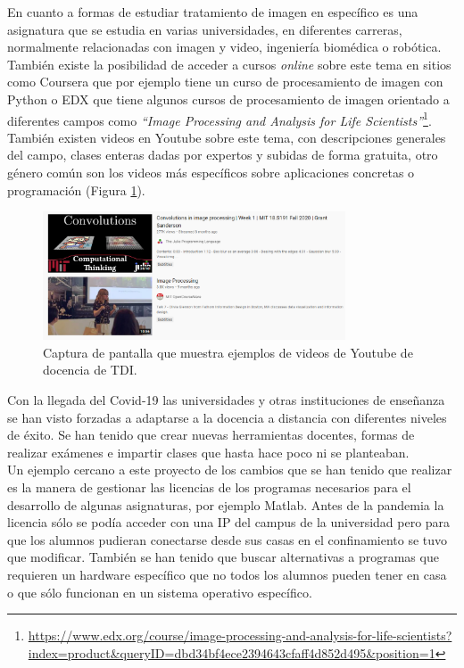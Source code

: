 En cuanto a formas de estudiar tratamiento de imagen en específico es una asignatura que se estudia en varias universidades, en diferentes carreras, normalmente relacionadas con imagen y video, ingeniería biomédica o robótica. También existe la posibilidad de acceder a cursos \emph{online} sobre este tema en sitios como Coursera que por ejemplo tiene un curso de procesamiento de imagen con Python o EDX que tiene algunos cursos de procesamiento de imagen orientado a diferentes campos como \emph{``Image Processing and Analysis for Life Scientists''}\footnote{\url{https://www.edx.org/course/image-processing-and-analysis-for-life-scientists?index=product&queryID=dbd34bf4ece2394643cfaff4d852d495&position=1}}. También existen videos en Youtube sobre este tema, con descripciones generales del campo, clases enteras dadas por expertos y subidas de forma gratuita, otro género común son los videos más específicos sobre aplicaciones concretas o programación (Figura \ref{youtube}).\\

\begin{figure}[h]
\centering
\includegraphics[width=0.8\textwidth]{imagenes/youtube.PNG}
\caption{Captura de pantalla que muestra ejemplos de videos de Youtube de docencia de TDI.}
\label{youtube}
\end{figure}

Con la llegada del Covid-19 las universidades y otras instituciones de enseñanza se han visto forzadas a adaptarse a la docencia a distancia con diferentes niveles de éxito. Se han tenido que crear nuevas herramientas docentes, formas de realizar exámenes e impartir clases que hasta hace poco ni se planteaban.\\

Un ejemplo cercano a este proyecto de los cambios que se han tenido que realizar es la manera de gestionar las licencias de los programas necesarios para el desarrollo de algunas asignaturas, por ejemplo Matlab. Antes de la pandemia la licencia sólo se podía acceder con una IP del campus de la universidad pero para que los alumnos pudieran conectarse desde sus casas en el confinamiento se tuvo que modificar. También se han tenido que buscar alternativas a programas que requieren un hardware específico que no todos los alumnos pueden tener en casa o que sólo funcionan en un sistema operativo específico.\\

